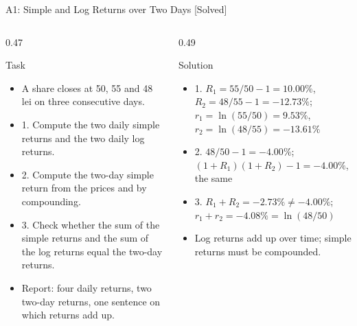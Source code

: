 \begin{frame}{A1: Simple and Log Returns over Two Days [Solved]}
\itemsize{\footnotesize}
\begin{columns}[T]
\begin{column}{0.47\textwidth}
\begin{block}{Task}
\begin{itemize}
    \item A share closes at 50, 55 and 48 lei on three consecutive days.
    \item 1. Compute the two daily simple returns and the two daily log returns.
    \item 2. Compute the two-day simple return from the prices and by compounding.
    \item 3. Check whether the sum of the simple returns and the sum of the log returns equal the two-day returns.
    \item Report: four daily returns, two two-day returns, one sentence on which returns add up.
\end{itemize}
\end{block}
\end{column}
\begin{column}{0.49\textwidth}
\begin{exampleblock}{Solution}
\begin{itemize}
    \item 1. $R_1 = 55/50 - 1 = 10.00\%$, $R_2 = 48/55 - 1 = -12.73\%$; $r_1 = \ln(55/50) = 9.53\%$, $r_2 = \ln(48/55) = -13.61\%$
    \item 2. $48/50 - 1 = -4.00\%$; $(1 + R_1)(1 + R_2) - 1 = -4.00\%$, the same
    \item 3. $R_1 + R_2 = -2.73\% \neq -4.00\%$; $r_1 + r_2 = -4.08\% = \ln(48/50)$
    \item Log returns add up over time; simple returns must be compounded.
\end{itemize}
\end{exampleblock}
\end{column}
\end{columns}
\end{frame}

